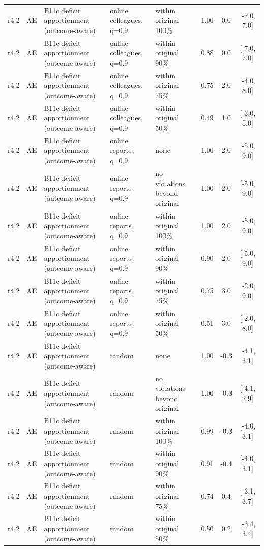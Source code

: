 \begin{longtable}{lllp{4.2cm}p{3.4cm}ccc}
r4.2 & AE & B11c deficit apportionment (outcome-aware) & online colleagues, q=0.9 & within original 100\% & 1.00 & 0.0 & [-7.0, 7.0] \\
r4.2 & AE & B11c deficit apportionment (outcome-aware) & online colleagues, q=0.9 & within original 90\% & 0.88 & 0.0 & [-7.0, 7.0] \\
r4.2 & AE & B11c deficit apportionment (outcome-aware) & online colleagues, q=0.9 & within original 75\% & 0.75 & 2.0 & [-4.0, 8.0] \\
r4.2 & AE & B11c deficit apportionment (outcome-aware) & online colleagues, q=0.9 & within original 50\% & 0.49 & 1.0 & [-3.0, 5.0] \\
r4.2 & AE & B11c deficit apportionment (outcome-aware) & online reports, q=0.9 & none & 1.00 & 2.0 & [-5.0, 9.0] \\
r4.2 & AE & B11c deficit apportionment (outcome-aware) & online reports, q=0.9 & no violations beyond original & 1.00 & 2.0 & [-5.0, 9.0] \\
r4.2 & AE & B11c deficit apportionment (outcome-aware) & online reports, q=0.9 & within original 100\% & 1.00 & 2.0 & [-5.0, 9.0] \\
r4.2 & AE & B11c deficit apportionment (outcome-aware) & online reports, q=0.9 & within original 90\% & 0.90 & 2.0 & [-5.0, 9.0] \\
r4.2 & AE & B11c deficit apportionment (outcome-aware) & online reports, q=0.9 & within original 75\% & 0.75 & 3.0 & [-2.0, 9.0] \\
r4.2 & AE & B11c deficit apportionment (outcome-aware) & online reports, q=0.9 & within original 50\% & 0.51 & 3.0 & [-2.0, 8.0] \\
r4.2 & AE & B11c deficit apportionment (outcome-aware) & random & none & 1.00 & -0.3 & [-4.1, 3.1] \\
r4.2 & AE & B11c deficit apportionment (outcome-aware) & random & no violations beyond original & 1.00 & -0.3 & [-4.1, 2.9] \\
r4.2 & AE & B11c deficit apportionment (outcome-aware) & random & within original 100\% & 0.99 & -0.3 & [-4.0, 3.1] \\
r4.2 & AE & B11c deficit apportionment (outcome-aware) & random & within original 90\% & 0.91 & -0.4 & [-4.0, 3.1] \\
r4.2 & AE & B11c deficit apportionment (outcome-aware) & random & within original 75\% & 0.74 & 0.4 & [-3.1, 3.7] \\
r4.2 & AE & B11c deficit apportionment (outcome-aware) & random & within original 50\% & 0.50 & 0.2 & [-3.4, 3.4] \\

\end{longtable}
